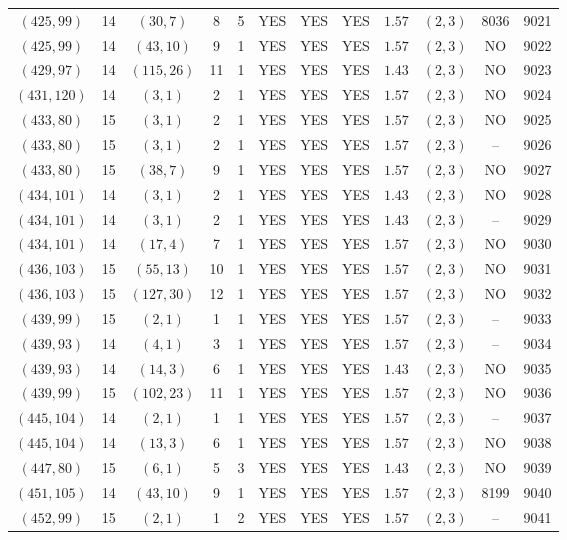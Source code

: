 \begin{longtable}{|c|c|c|c|c|c|c|c|c|c|c|c|}
$(425,99)$ & 14 & $(30,7)$ & 8 & 5 & YES & YES & YES & $1.57$ & $(2,3)$ & 8036 & 9021\\
$(425,99)$ & 14 & $(43,10)$ & 9 & 1 & YES & YES & YES & $1.57$ & $(2,3)$ & NO & 9022\\
$(429,97)$ & 14 & $(115,26)$ & 11 & 1 & YES & YES & YES & $1.43$ & $(2,3)$ & NO & 9023\\
$(431,120)$ & 14 & $(3,1)$ & 2 & 1 & YES & YES & YES & $1.57$ & $(2,3)$ & NO & 9024\\
$(433,80)$ & 15 & $(3,1)$ & 2 & 1 & YES & YES & YES & $1.57$ & $(2,3)$ & NO & 9025\\
$(433,80)$ & 15 & $(3,1)$ & 2 & 1 & YES & YES & YES & $1.57$ & $(2,3)$ & -- & 9026\\
$(433,80)$ & 15 & $(38,7)$ & 9 & 1 & YES & YES & YES & $1.57$ & $(2,3)$ & NO & 9027\\
$(434,101)$ & 14 & $(3,1)$ & 2 & 1 & YES & YES & YES & $1.43$ & $(2,3)$ & NO & 9028\\
$(434,101)$ & 14 & $(3,1)$ & 2 & 1 & YES & YES & YES & $1.43$ & $(2,3)$ & -- & 9029\\
$(434,101)$ & 14 & $(17,4)$ & 7 & 1 & YES & YES & YES & $1.57$ & $(2,3)$ & NO & 9030\\
$(436,103)$ & 15 & $(55,13)$ & 10 & 1 & YES & YES & YES & $1.57$ & $(2,3)$ & NO & 9031\\
$(436,103)$ & 15 & $(127,30)$ & 12 & 1 & YES & YES & YES & $1.57$ & $(2,3)$ & NO & 9032\\
$(439,99)$ & 15 & $(2,1)$ & 1 & 1 & YES & YES & YES & $1.57$ & $(2,3)$ & -- & 9033\\
$(439,93)$ & 14 & $(4,1)$ & 3 & 1 & YES & YES & YES & $1.57$ & $(2,3)$ & -- & 9034\\
$(439,93)$ & 14 & $(14,3)$ & 6 & 1 & YES & YES & YES & $1.43$ & $(2,3)$ & NO & 9035\\
$(439,99)$ & 15 & $(102,23)$ & 11 & 1 & YES & YES & YES & $1.57$ & $(2,3)$ & NO & 9036\\
$(445,104)$ & 14 & $(2,1)$ & 1 & 1 & YES & YES & YES & $1.57$ & $(2,3)$ & -- & 9037\\
$(445,104)$ & 14 & $(13,3)$ & 6 & 1 & YES & YES & YES & $1.57$ & $(2,3)$ & NO & 9038\\
$(447,80)$ & 15 & $(6,1)$ & 5 & 3 & YES & YES & YES & $1.43$ & $(2,3)$ & NO & 9039\\
$(451,105)$ & 14 & $(43,10)$ & 9 & 1 & YES & YES & YES & $1.57$ & $(2,3)$ & 8199 & 9040\\
$(452,99)$ & 15 & $(2,1)$ & 1 & 2 & YES & YES & YES & $1.57$ & $(2,3)$ & -- & 9041\\

\end{longtable}
